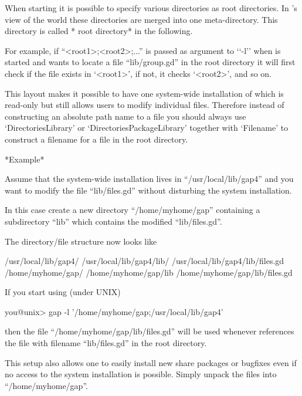
When   starting {\GAP} it is possible   to specify various directories as
root directories.  In  {\GAP}'s view of  the world these  directories are
merged  into one meta-directory.  This  directory is called *{\GAP}  root
directory* in the following.

For  example,   if  ``<root1>;<root2>;...''  is   passed  as argument  to
`{`-l'}' when  {\GAP}  is  started and  {\GAP}  wants  to locate   a file
``lib/group.gd'' in the {\GAP} root directory it will  first check if the
file exists in `<root1>', if not, it checks `<root2>', and so on.

This layout makes  it possible to  have one  system-wide  installation of
{\GAP}  which is read-only  but still  allows users  to modify individual
files.  Therefore instead of constructing an absolute path name to a file
you should always use `DirectoriesLibrary' or `DirectoriesPackageLibrary'
together with `Filename' to construct a filename for a file in the {\GAP}
root directory.

*Example*

Assume that the system-wide installation lives in ``/usr/local/lib/gap4''
and you want  to modify the  file ``lib/files.gd'' without disturbing the
system installation.

In  this case create  a  new directory ``/home/myhome/gap'' containing  a
subdirectory ``lib'' which contains the modified ``lib/files.gd''.

The directory/file structure now looks like

\begintt
/usr/local/lib/gap4/
/usr/local/lib/gap4/lib/
/usr/local/lib/gap4/lib/files.gd
/home/myhome/gap/
/home/myhome/gap/lib
/home/myhome/gap/lib/files.gd
\endtt


If you start {\GAP} using (under UNIX)

\begintt
you@unix> gap -l '/home/myhome/gap;/usr/local/lib/gap4'
\endtt

then the  file  ``/home/myhome/gap/lib/files.gd'' will  be  used whenever
{\GAP} references the  file with filename  ``lib/files.gd'' in the {\GAP}
root directory.

This setup also  allows one to easily install  new share packages or
bugfixes even if no access to the system {\GAP} installation  is possible.
Simply unpack the files into ``/home/myhome/gap''.


